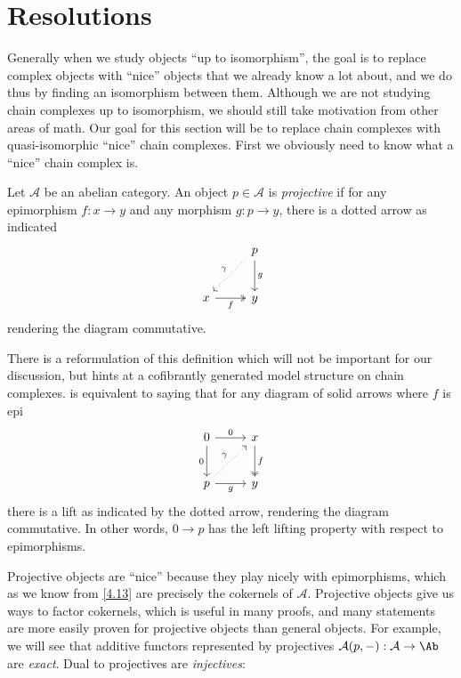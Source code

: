 \section{Resolutions}\label{sec6}

Generally when we study objects ``up to isomorphism'', the goal is to replace complex objects with ``nice'' objects that we already know a lot about, and we do thus by finding an isomorphism between them. Although we are not studying chain complexes up to isomorphism, we should still take motivation from other areas of math. Our goal for this section will be to replace chain complexes with quasi-isomorphic ``nice'' chain complexes. First we obviously need to know what a ``nice'' chain complex is.

\begin{definition}\label{6.1}
	Let $\mathcal{A} $ be an abelian category. An object $p\in \mathcal{A} $ is \emph{projective} if for any epimorphism $f : x \to y$ and any morphism $g : p \to y$, there is a dotted arrow as indicated
	\[\begin{tikzcd}[row sep = 2.5em, column sep = 2.5em]
	 & p\ar[" g ", d] \ar[" \gamma  "', dotted, dl]  \\
	x\ar[" f "', two heads, r]  & y
	\end{tikzcd}\]
	rendering the diagram commutative.
\end{definition}

\begin{remark}\label{6.2}
	There is a reformulation of this definition which will not be important for our discussion, but hints at a cofibrantly generated model structure on chain complexes.  is equivalent to saying that for any diagram of solid arrows where $f$ is epi
	\[\begin{tikzcd}[row sep = 2.5em, column sep = 2.5em]
	0\ar[" 0 "', d] \ar[" 0 ", r]  & x\ar[" f ", two heads, d]  \\
	p\ar[" \gamma  ", dotted, ur] \ar[" g "', r]  & y
	\end{tikzcd}\]
	there is a lift as indicated by the dotted arrow, rendering the diagram commutative. In other words, $0\to p$ has the left lifting property with respect to epimorphisms.
\end{remark}

Projective objects are ``nice'' because they play nicely with epimorphisms, which as we know from \cref{4.13} are precisely the cokernels of $\mathcal{A} $. Projective objects give us ways to factor cokernels, which is useful in many proofs, and many statements are more easily proven for projective objects than general objects. For example, we will see that additive functors represented by projectives $\mathcal{A} (p,-): \mathcal{A}  \to \Ab $ are \emph{exact}. Dual to projectives are \emph{injectives}:

